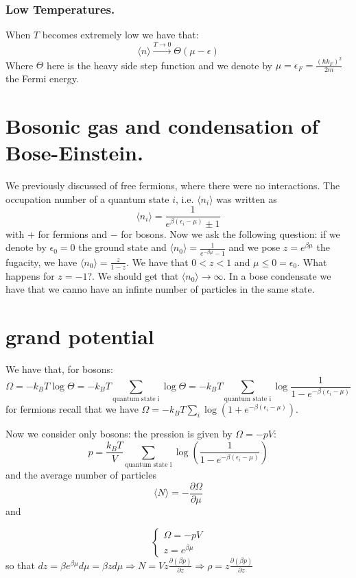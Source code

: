 \documentclass[10pt,a4paper]{book}
\begin{document}
\subsubsection{Low Temperatures.}
When $T$ becomes extremely low we have that: 
\[
\langle n \rangle \stackrel{T \to 0}{\longrightarrow} \Theta(\mu - \epsilon)
\]
Where $\Theta$ here is the heavy side step function and we denote by $\mu = \epsilon_F = \frac{(\hbar k_F)^2}{2m}$ the Fermi energy.

\section{Bosonic gas and condensation of Bose-Einstein.}

We previously discussed of free fermions, where there were no interactions. The occupation number of a quantum state $i$, i.e. $\langle n_i\rangle$ was written as 
$$\langle n_i\rangle=\frac{1}{e^{\beta(\epsilon_i- \mu)}\pm 1}$$ with $+$ for fermions and $-$ for bosons. Now we ask the following question: if we denote by $\epsilon_0=0$ the ground state and $\langle n_0\rangle=\frac{1}{e^{-\beta\mu}-1}$ and we pose $z=e^{\beta\mu}$ the fugacity, we have $\langle n_0\rangle=\frac{z}{1-z}$. We have that $0<z<1$ and $\mu\leq 0=\epsilon_0$. What happens for $z=-1$?. We should get that $\langle n_0\rangle\to\infty$. In a bose condensate we have that we canno have an infinte number of particles in the same state.

\section{grand potential}

We have that, for bosons:
$$\Omega=-k_BT\log\Theta=-k_BT\sum_{\text{quantum state i}}\log\Theta=-k_BT\sum_{\text{quantum state i}}\log\frac{1}{1-e^{-\beta(\epsilon_i-\mu)}}$$
for fermions recall that we have $\Omega=-k_BT\sum_i\log(1+e^{-\beta(\epsilon_i-\mu)})$.



 Now we consider only bosons: the pression is given by $\Omega=-pV$:
$$p=\frac{k_BT}{V}\sum_{\text{quantum state i}}\log(\frac{1}{1-e^{-\beta(\epsilon_i-\mu)}})$$
and the average number  of particles 
$$\langle N\rangle =-\frac{\partial\Omega}{\partial\mu}$$ and

$$\begin{cases} 
\Omega=-pV\\
z=e^{\beta\mu}
\end{cases}
$$
so that $dz=\beta e^{\beta\mu}d\mu=\beta zd\mu\Rightarrow N=Vz\frac{\partial(\beta p)}{\partial z}\Rightarrow \rho=z\frac{\partial(\beta p)}{\partial z}$
\end{document}
